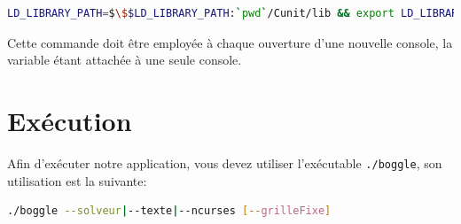\documentclass[12pt,a4paper,openany]{book}
\begin{document}
	\begin{lstlisting}[language=sh,numbers=none]
LD_LIBRARY_PATH=$\$$LD_LIBRARY_PATH:`pwd`/Cunit/lib && export LD_LIBRARY_PATH		
	\end{lstlisting}

	Cette commande doit être employée à chaque ouverture d'une nouvelle console, la variable étant attachée à une seule console.  

	\section{Exécution}
	Afin d'exécuter notre application, vous devez utiliser l'exécutable \texttt{./boggle}, son utilisation est la suivante:

	\begin{lstlisting}[language=sh,numbers=none]
./boggle --solveur|--texte|--ncurses [--grilleFixe]		
	\end{lstlisting}
\end{document}
